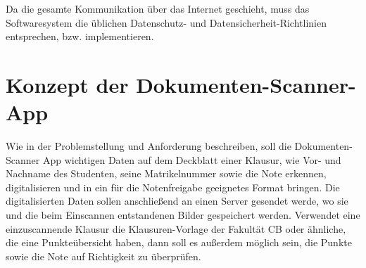 \documentclass[nomenclature, onesided, 150]{HSMW-Thesis}
\begin{document}
	Da die gesamte Kommunikation über das Internet geschieht, muss das Softwaresystem die üblichen Datenschutz- und Datensicherheit-Richtlinien entsprechen, bzw. implementieren.
	


\chapter{Konzept der Dokumenten-Scanner-App}
	Wie in der Problemstellung und Anforderung beschreiben, soll die Dokumenten-Scanner App wichtigen Daten auf dem Deckblatt einer Klausur, wie Vor- und Nachname des Studenten, seine Matrikelnummer sowie die Note erkennen, digitalisieren und in ein für die Notenfreigabe geeignetes Format bringen. Die digitalisierten Daten sollen anschließend an einen Server gesendet werde, wo sie und die beim Einscannen entstandenen Bilder gespeichert werden. Verwendet eine einzuscannende Klausur die Klausuren-Vorlage der Fakultät CB oder ähnliche, die eine Punkteübersicht haben, dann soll es außerdem möglich sein, die Punkte sowie die Note auf Richtigkeit zu überprüfen. 
\end{document}
